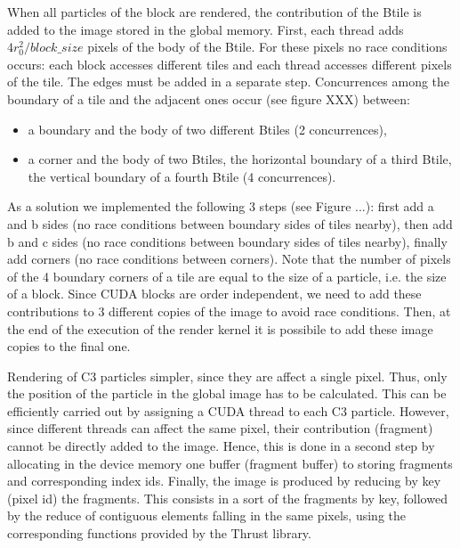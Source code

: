 \documentclass[11pt]{article}
\begin{document}
When all particles of the block are rendered, the contribution of the Btile 
is added to the image stored in the global memory. First, each thread adds
$4r_0^2/block\_size$ pixels of the body of the Btile. For these pixels no race 
conditions occurs: each block accesses different tiles and each thread accesses 
different pixels of the tile. The edges must be added in a separate step. 
Concurrences among the boundary of a tile and the adjacent ones occur (see
figure XXX) between:
\begin{itemize}
\item
a boundary and the body of two different Btiles (2 concurrences), 
\item
a corner and the body of two Btiles, the horizontal boundary 
of a third Btile, the vertical boundary of a fourth Btile (4 concurrences). 
\end{itemize}
As a solution we implemented the following 3 steps (see Figure ...):  
first add a and b sides (no race conditions between boundary sides of tiles nearby),
then add b and c sides (no race conditions between boundary sides of tiles nearby),
finally add corners (no race conditions between corners). 
Note that the number of pixels of the 4 boundary corners of a tile are equal to 
the size of a particle, i.e. the size of a block. Since CUDA blocks are order 
independent, we need to add these contributions to 3 different copies of the image 
to avoid race conditions. Then, at the end of the execution of the render kernel 
it is possibile to add these image copies to the final one.

Rendering of C3 particles simpler, since they are affect a single pixel. 
Thus, only the position of the particle in the global image has to be calculated.
This can be efficiently carried out by assigning a CUDA thread to each C3 particle. 
However, since different threads can affect the same pixel, their contribution (fragment) 
cannot be directly added to the image. Hence, this is done in a second step by allocating 
in the device memory one buffer (fragment buffer) to storing fragments and
corresponding index ids. Finally, the image is produced by reducing by key (pixel id) the 
fragments. This consists in a sort of the fragments by key, followed by the reduce of 
contiguous elements falling in the same pixels, using the corresponding 
functions provided by the Thrust library.
\end{document}
